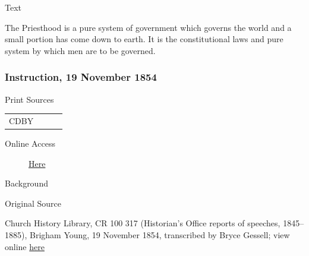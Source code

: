 				\begin{description}
					\item[Text]
				\end{description}
				
					The Priesthood is a pure system of government which governs the world and a small portion has come down to earth. It is the constitutional laws and pure system by which men are to be governed.
					
		\subsubsection{Instruction, 19 November 1854}
			\label{EMS-1854-BY-19-NOV-1854}
			
			\begin{description}
					\item[Print Sources]
				\end{description}

					\begin{tabular}{p{0.5in}p{1in}p{0.5in}p{1in}}
					CDBY	& 		&  		&  \\
					\end{tabular}
				
				\begin{description}
					\item[Online Access] \href{https://catalog.churchofjesuschrist.org/assets/c05f1725-7304-4a19-ae73-91fc46573e0e/0/0}{Here}
				\end{description}
				
				\begin{description}
					\item[Background]
				\end{description}
				
					\phantom{.}
				
				\begin{description}
					\item[Original Source]
				\end{description}
				
					Church History Library, CR 100 317 (Historian's Office reports of speeches, 1845--1885), Brigham Young, 19 November 1854, transcribed by Bryce Gessell; view online \href{https://catalog.churchofjesuschrist.org/assets/c05f1725-7304-4a19-ae73-91fc46573e0e/0/0}{here}
				
